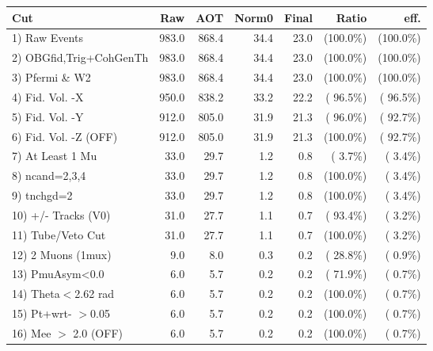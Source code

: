  \begin{table}[h!]\centering
 \begin{tabular}{||l||r|r|r|r|r|r||}
 \hline
 \hline
 Cut & Raw & AOT & Norm0 & Final & Ratio & eff.       \\
 \hline
  1) Raw Events           &        983.0 &        868.4 &         34.4 &         23.0 & (100.0\%) & (100.0\%) \\
  2) OBGfid,Trig+CohGenTh &        983.0 &        868.4 &         34.4 &         23.0 & (100.0\%) & (100.0\%) \\
  3) Pfermi \& W2         &        983.0 &        868.4 &         34.4 &         23.0 & (100.0\%) & (100.0\%) \\
  4) Fid. Vol. -X         &        950.0 &        838.2 &         33.2 &         22.2 & ( 96.5\%) & ( 96.5\%) \\
  5) Fid. Vol. -Y         &        912.0 &        805.0 &         31.9 &         21.3 & ( 96.0\%) & ( 92.7\%) \\
  6) Fid. Vol. -Z (OFF)   &        912.0 &        805.0 &         31.9 &         21.3 & (100.0\%) & ( 92.7\%) \\
  7) At Least 1 Mu        &         33.0 &         29.7 &          1.2 &          0.8 & (  3.7\%) & (  3.4\%) \\
  8) ncand=2,3,4          &         33.0 &         29.7 &          1.2 &          0.8 & (100.0\%) & (  3.4\%) \\
  9) tnchgd=2             &         33.0 &         29.7 &          1.2 &          0.8 & (100.0\%) & (  3.4\%) \\
 10) +/- Tracks (V0)      &         31.0 &         27.7 &          1.1 &          0.7 & ( 93.4\%) & (  3.2\%) \\
 11) Tube/Veto Cut        &         31.0 &         27.7 &          1.1 &          0.7 & (100.0\%) & (  3.2\%) \\
 12) 2 Muons (1mux)       &          9.0 &          8.0 &          0.3 &          0.2 & ( 28.8\%) & (  0.9\%) \\
 13) PmuAsym<0.0          &          6.0 &          5.7 &          0.2 &          0.2 & ( 71.9\%) & (  0.7\%) \\
 14) Theta$<$2.62 rad     &          6.0 &          5.7 &          0.2 &          0.2 & (100.0\%) & (  0.7\%) \\
 15) Pt+wrt- $>$0.05      &          6.0 &          5.7 &          0.2 &          0.2 & (100.0\%) & (  0.7\%) \\
 16) Mee $>$ 2.0  (OFF)   &          6.0 &          5.7 &          0.2 &          0.2 & (100.0\%) & (  0.7\%) \\

\end{tabular}
\end{table}
